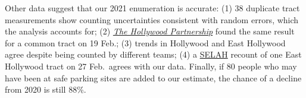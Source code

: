 \documentclass[11pt]{article}
\def\selah{SELAH}
\begin{document}
Other data suggest that our 2021 enumeration is accurate: (1) 38 duplicate tract measurements 
show counting uncertainties consistent with random errors, which the analysis accounts for; (2) 
\href{https://hollywoodpartnership.com/}{\it The Hollywood Partnership} found the same result for
a common tract on 19 Feb.; (3) trends in Hollywood and East Hollywood agree despite being counted 
by different teams; (4) a \href{https://selahnch.org}{\selah} recount of one East Hollywood tract on 
27 Feb.\ agrees with our data. Finally, if 80 people who may have been at safe parking sites are added 
to our estimate, the chance of a decline from 2020 is still 88\%.\\
\end{document}
